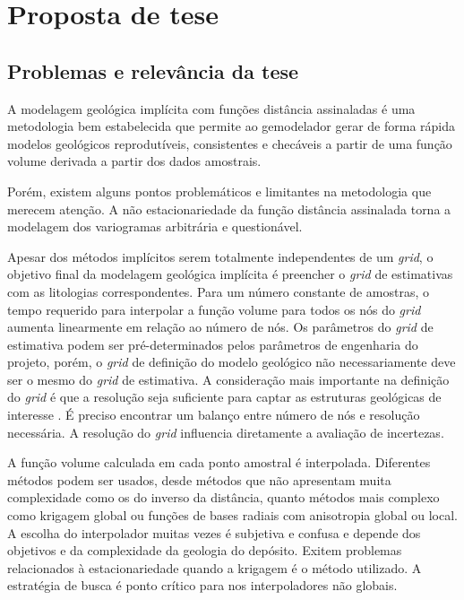 \chapter{Proposta de tese}

\section{Problemas e relevância da tese}\label{problemas}

A modelagem geológica implícita com funções distância assinaladas é uma metodologia bem estabelecida que permite ao gemodelador gerar de forma rápida modelos geológicos reprodutíveis, consistentes e checáveis a partir de uma função volume derivada a partir dos dados amostrais. 

Porém, existem alguns pontos problemáticos e limitantes na metodologia que merecem atenção. A não estacionariedade da função distância assinalada torna a modelagem dos variogramas arbitrária e questionável.

Apesar dos métodos implícitos serem totalmente independentes de um \textit{grid}, o objetivo final da modelagem geológica implícita é preencher o \textit{grid} de estimativas com as litologias correspondentes. Para um número constante de amostras, o tempo requerido para interpolar a função volume para todos os nós do \textit{grid} aumenta linearmente em relação ao número de nós. Os parâmetros do \textit{grid} de estimativa podem ser pré-determinados pelos parâmetros de engenharia do projeto, porém, o \textit{grid} de definição do modelo geológico não necessariamente deve ser o mesmo do \textit{grid} de estimativa. A consideração mais importante na definição do \textit{grid} é que a resolução seja suficiente para captar as estruturas geológicas de interesse \cite{martin2017implicitmodeling}. É preciso encontrar um balanço entre número de nós e resolução necessária. A resolução do \textit{grid} influencia diretamente a avaliação de incertezas.

A função volume calculada em cada ponto amostral é interpolada. Diferentes métodos podem ser usados, desde métodos que não apresentam muita complexidade como os do inverso da distância, quanto métodos mais complexo como krigagem global ou funções de bases radiais com anisotropia global ou local. A escolha do interpolador muitas vezes é subjetiva e confusa e depende dos objetivos e da complexidade da geologia do depósito. Exitem problemas relacionados à estacionariedade quando a krigagem é o método utilizado. A estratégia de busca é ponto crítico para nos interpoladores não globais.

